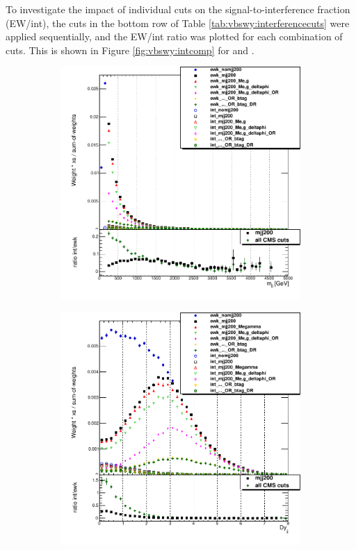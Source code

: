 To investigate the impact of individual cuts on the signal-to-interference fraction (EW/int), the cuts in the bottom row of Table \ref{tab:vbswy:interferencecuts} were applied sequentially, and the EW/int ratio was plotted for each combination of cuts. This is shown in Figure \ref{fig:vbswy:intcomp} for \mjj and \dyjj.

\begin{figure}[t]
\centering
\begin{subfigure}[b]{0.48\textwidth}
    \centering
    \includegraphics[width=\textwidth]{plots/diffx/mjj_comparison.pdf}
    \caption{}
    \label{fig:vbswyint:a}
\end{subfigure}
\hfill
\begin{subfigure}[b]{0.48\textwidth}
    \centering
    \includegraphics[width=\textwidth]{plots/diffx/dyjj_comparison.pdf}

\end{subfigure}
\end{figure}
